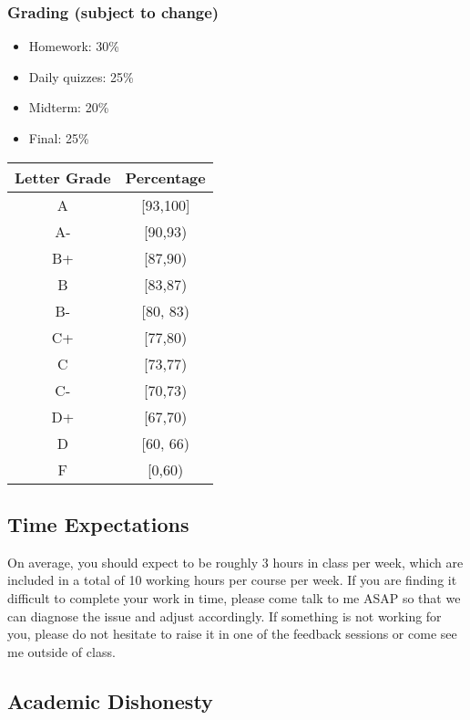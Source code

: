\documentclass[
]{article}
\providecommand{\tightlist}{%
  \setlength{\itemsep}{0pt}\setlength{\parskip}{0pt}}
\begin{document}
\hypertarget{grading-subject-to-change}{%
\subsubsection*{Grading (subject to change)}\label{grading-subject-to-change}}

\begin{itemize}
\tightlist
\item
  Homework: 30\%
\item
  Daily quizzes: 25\%
\item
  Midterm: 20\%
\item
  Final: 25\%
\end{itemize}

\begin{longtable}[]{@{}cc@{}}
\toprule\noalign{}
\textbf{Letter Grade} & \textbf{Percentage} \\
\midrule\noalign{}
\endhead
\bottomrule\noalign{}
\endlastfoot
A & {[}93,100{]} \\
A- & {[}90,93) \\
B+ & {[}87,90) \\
B & {[}83,87) \\
B- & {[}80, 83) \\
C+ & {[}77,80) \\
C & {[}73,77) \\
C- & {[}70,73) \\
D+ & {[}67,70) \\
D & {[}60, 66) \\
F & {[}0,60) \\
\end{longtable}

\hypertarget{time-expectations}{%
\subsection*{Time Expectations}\label{time-expectations}}

On average, you should expect to be roughly 3 hours in class per week, which are included in a total of 10 working hours per course per week. If you are finding it difficult to complete your work in time, please come talk to me ASAP so that we can diagnose the issue and adjust accordingly. If something is not working for you, please do not hesitate to raise it in one of the feedback sessions or come see me outside of class.

\hypertarget{academic-dishonesty}{%
\subsection*{Academic Dishonesty}\label{academic-dishonesty}}
\end{document}
